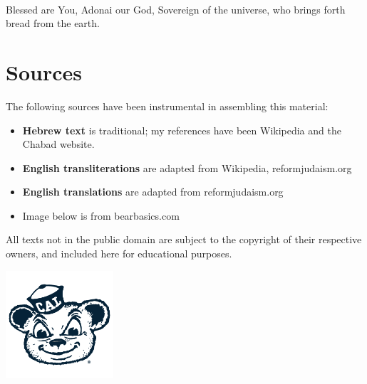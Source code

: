 \documentclass[letterpaper,10pt]{article}
\newenvironment{HgEnglish}{\strut\\\noindent}{\vspace{1em}}
\begin{document}
\begin{HgEnglish}
Blessed are You, Adonai our God, Sovereign of the universe, who brings forth bread from the earth.
\end{HgEnglish}

\section*{Sources}

The following sources have been instrumental in assembling this material:

\begin{itemize}
  \item {\bfseries Hebrew text} is traditional; my references have been Wikipedia and the Chabad website.
  \item {\bfseries English transliterations} are adapted from Wikipedia, reformjudaism.org
  \item {\bfseries English translations} are adapted from reformjudaism.org
  \item Image below is from bearbasics.com
\end{itemize}

\noindent
All texts not in the public domain are subject to the copyright of their
respective owners, and included here for educational purposes.

\vfill
\begin{center}
  \includegraphics[width=4cm]{oski.png}
\end{center}
\end{document}
